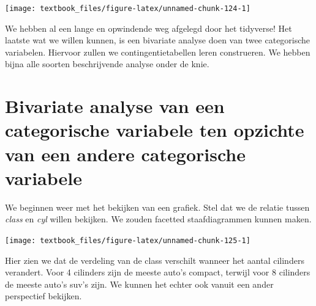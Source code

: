 \documentclass[]{tufte-book}
\newenvironment{Shaded}{}{}
\newcommand{\KeywordTok}[1]{\textcolor[rgb]{0.00,0.44,0.13}{\textbf{#1}}}
\newcommand{\NormalTok}[1]{#1}
\newcommand{\OperatorTok}[1]{\textcolor[rgb]{0.40,0.40,0.40}{#1}}
\newcommand{\StringTok}[1]{\textcolor[rgb]{0.25,0.44,0.63}{#1}}
\begin{document}
\texttt{[image: textbook\_files/figure-latex/unnamed-chunk-124-1]}

We hebben al een lange en opwindende weg afgelegd door het tidyverse! Het laatste wat we willen kunnen, is een bivariate analyse doen van twee categorische variabelen. Hiervoor zullen we contingentietabellen leren construeren. We hebben bijna alle soorten beschrijvende analyse onder de knie.

\hypertarget{bivariate-analyse-van-een-categorische-variabele-ten-opzichte-van-een-andere-categorische-variabele}{%
\section{Bivariate analyse van een categorische variabele ten opzichte van een andere categorische variabele}\label{bivariate-analyse-van-een-categorische-variabele-ten-opzichte-van-een-andere-categorische-variabele}}

We beginnen weer met het bekijken van een grafiek. Stel dat we de relatie tussen \emph{class} en \emph{cyl} willen bekijken. We zouden facetted staafdiagrammen kunnen maken.

\begin{Shaded}
\end{Shaded}

\texttt{[image: textbook\_files/figure-latex/unnamed-chunk-125-1]}

Hier zien we dat de verdeling van de class verschilt wanneer het aantal cilinders verandert. Voor 4 cilinders zijn de meeste auto's compact, terwijl voor 8 cilinders de meeste auto's suv's zijn. We kunnen het echter ook vanuit een ander perspectief bekijken.

\begin{Shaded}
\end{Shaded}
\end{document}
